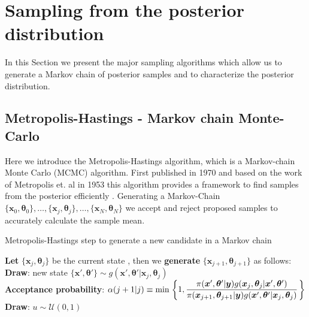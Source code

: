 \section{Sampling from the posterior distribution}
In this Section we present the major sampling algorithms which allow us to generate a Markov chain of posterior samples and to characterize the posterior distribution.


\subsection{Metropolis-Hastings - Markov chain Monte-Carlo}
\label{subsec:MetroHast}
Here we introduce the Metropolis-Hastings algorithm, which is a Markov-chain Monte Carlo (MCMC) algorithm.
First published in 1970 and based on the work of Metropolis et. al in 1953 this algorithm provides a framework to find samples from the posterior efficiently \cite{hastings1970monte, metropolis1953equation}.
Generating a Markov-Chain $\{ \bm{x}_0, \bm{\theta}_0 \}, \dots, \{ \bm{x}_j, \bm{\theta}_j \}, \dots, \{ \bm{x}_N, \bm{\theta}_N \}$ we accept and reject proposed samples to accurately calculate the sample mean.



\begin{algorithm}[!thb]
    \caption{Metropolis-Hastings step to  generate a new candidate in a Markov chain}
    \label{alg:metroHasti}
    \SetAlgoLined
    \nonl \textbf{Let}  $\{ \bm{x}_j, \bm{\theta}_j \}$ be the current state , then we \textbf{generate} $\{ \bm{x}_{j+1}, \bm{\theta}_{j+1} \}$ as follows: \\
    \textbf{Draw}: new state $\{ \bm{x}', \bm{\theta}' \}  \sim  g(\bm{x}', \bm{\theta}'|\bm{x}_j, \bm{\theta}_j )$  \\
    \textbf{Acceptance probability}: $\alpha(j+1|j) \equiv \min 
    \begin{rcases}
        \begin{dcases}
            1, \frac{\pi( \bm{x}', \bm{\theta}' | \bm{y}) g(\bm{x}_j, \bm{\theta}_j|\bm{x}', \bm{\theta}' )}{\pi( \bm{x}_{j+1}, \bm{\theta}_{j+1}| \bm{y}) g(\bm{x}', \bm{\theta}'|\bm{x}_j, \bm{\theta}_j )}
        \end{dcases}
    \end{rcases} $ \\
    \textbf{Draw}: $ u \sim \mathcal{U}(0,1)$ \\ 
    {}
\end{algorithm}


